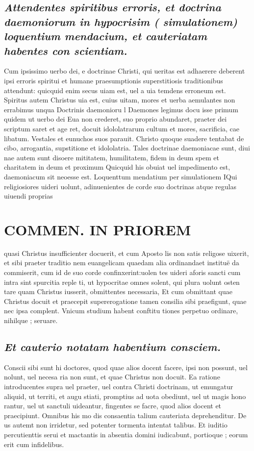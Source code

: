 \documentclass{article}
\begin{document}
\begin{pages}
\subsection*{\textit{Attendentes spiritibus erroris, et doctrina daemoniorum in hypocrisim ( simulationem) loquentium mendacium, et cauteriatam habentes con scientiam. }}\pstart Cum ipsissimo uerbo dei, e doctrinae Christi, qui ueritas est adhaerere deberent ipsi erroris spiritui et humane praesumptionis superstitiosis traditionibus attendunt: quicquid enim secus uiam est, uel a uia temdens erroneum est. Spiritus autem Christus uia est, cuius uitam, mores et uerba aemulantes non errabimus unqua  \pend\pstart Doctrinis daemonioru l Daemones legimus docu isse primum quidem ut uerbo dei Eua non crederet, suo proprio abundaret, praeter dei scriptum saret et age ret, docuit idololatrarum cultum et mores, sacrificia, cae libatum. Vestales et eunuchos suos parauit. Christo quoque suadere tentabat de cibo, arrogantia, supstitione et idololatria. Tales doctrinae daemoniacae sunt, diui nae autem sunt disoere mititatem, humilitatem, fidem in deum spem et charitatem in deum et proximum Quicquid his obuiat uel impedimento est, daemoniacum sit neoesse est.  \pend\pstart Loquenttum mendatium per simulationem IQui religiosiores uideri uolunt, adinuenientes de corde suo doctrinas atque regulas uiuendi proprias  \pend
\section*{COMMEN. IN PRIOREM }
\marginpar{[ p.96 ]}\pstart quasi Christus insufficienter docuerit, et cum Aposto lis non satis religose uixerit, et sibi praeter traditio nem euangelicam quaedam alia ordinandaet instituë da commiserit, cum id de suo corde confinxerint:uolen tes uideri aforis sancti cum intra sint spurcitia reple ti, ut hypocritae omnes solent, qui plura uolunt osten tare quam Christus iusserit, obmittentes necessaria, Et cum obmittant quae Christus docuit et praecepit supererogatione tamen consilia sibi praefigunt, quae nec ipsa complent. Vnicum studium habent conftitu tiones perpetuo ordinare, nihilque ; seruare.  \pend
{}
{}
\subsection*{\textit{Et cauterio notatam habentium consciem. }}\pstart Conscii sibi sunt hi doctores, quod quae alios docent facere, ipsi non possunt, uel nolunt, uel necesa ria non sunt, et quae Christus non docuit. Ea ratione introducentes supra uel praeter, uel contra Christi doctrinam, ut emungatur aliquid, ut territi, et augu stiati, promptius ad uota obediunt, uel ut magis hono rantur, uel ut sanctuli uideantur, fingentes se facre, quod alios docent et praecipiunt. Omnibus his mo dis consaentia talium cauteriata deprehenditur. De us autemt non irridetur, sed potenter tormenta intentat talibus. Et iuditio percutienttis serui et mactantis in absentia domini iudicabunt, portioque ; eorum erit cum infidelibus.  \pend

\end{pages}
\end{document}
